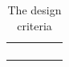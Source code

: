 \documentclass[whitelogo]{tudelft-report}
\begin{document}
{{\begin{table}[]
\begin{tabular}{|l|l|l|l|l|}
                                    &                                                                                                                                                                 &                                                                                                                                                                                                                              &                                                                                                              &                                                                                                                               \\
                                    &                                                                                                                                                                 &                                                                                                                                                                                                                              &                                                                                                              &                                                                                                                               \\
                                    &                                                                                                                                                                 &                                                                                                                                                                                                                              &                                                                                                              &                                                                                                                               \\
                                    &                                                                                                                                                                 &                                                                                                                                                                                                                              &                                                                                                              &                                                                                                                               \\ \hline
\end{tabular}
\caption{The design criteria}
\end{table}

}}
\end{document}
